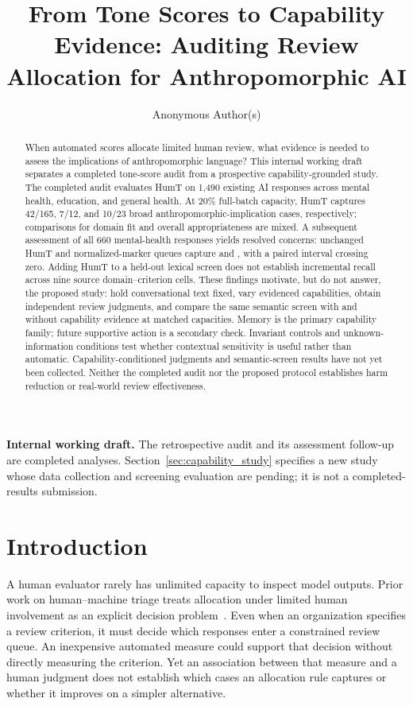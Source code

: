 \documentclass[manuscript,screen,review,anonymous]{acmart}
\title{From Tone Scores to Capability Evidence: Auditing Review Allocation for Anthropomorphic AI}
\author{Anonymous Author(s)}
\begin{document}
\begin{abstract}
When automated scores allocate limited human review, what evidence is needed to assess the implications of anthropomorphic language? This internal working draft separates a completed tone-score audit from a prospective capability-grounded study. The completed audit evaluates HumT on 1,490 existing AI responses across mental health, education, and general health. At 20\% full-batch capacity, HumT captures 42/165, 7/12, and 10/23 broad anthropomorphic-implication cases, respectively; comparisons for domain fit and overall appropriateness are mixed. A subsequent assessment of all 660 mental-health responses yields \IAPositive{} resolved concerns: unchanged HumT and normalized-marker queues capture \IAHCaught{} and \IAMCaught{}, with a paired interval crossing zero. Adding HumT to a held-out lexical screen does not establish incremental recall across nine source domain--criterion cells. These findings motivate, but do not answer, the proposed study: hold conversational text fixed, vary evidenced capabilities, obtain independent review judgments, and compare the same semantic screen with and without capability evidence at matched capacities. Memory is the primary capability family; future supportive action is a secondary check. Invariant controls and unknown-information conditions test whether contextual sensitivity is useful rather than automatic. Capability-conditioned judgments and semantic-screen results have not yet been collected. Neither the completed audit nor the proposed protocol establishes harm reduction or real-world review effectiveness.
\end{abstract}
\maketitle
\noindent\textbf{Internal working draft.} The retrospective audit and its assessment follow-up are completed analyses. Section~\ref{sec:capability_study} specifies a new study whose data collection and screening evaluation are pending; it is not a completed-results submission.

\section{Introduction}
A human evaluator rarely has unlimited capacity to inspect model outputs. Prior work on human--machine triage treats allocation under limited human involvement as an explicit decision problem~\cite{okati2021triage}. Even when an organization specifies a review criterion, it must decide which responses enter a constrained review queue. An inexpensive automated measure could support that decision without directly measuring the criterion. Yet an association between that measure and a human judgment does not establish which cases an allocation rule captures or whether it improves on a simpler alternative.
\end{document}
